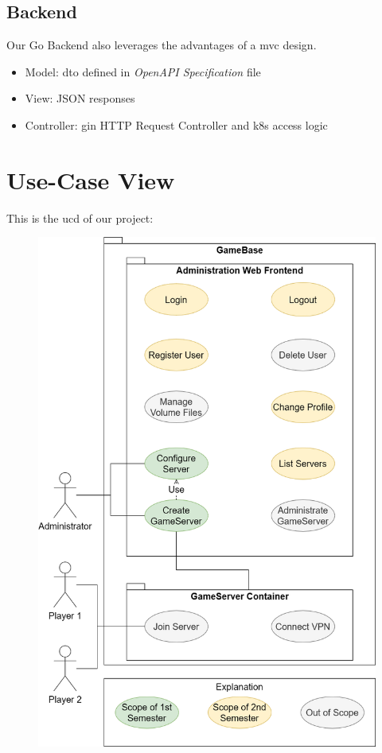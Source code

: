 \documentclass[a4paper,12pt,chapterprefix=false,bibliography=totoc,listof=totoc,]{scrreprt}
\begin{document}
\section{Backend}
Our Go Backend also leverages the advantages of a \gls{mvc} design.
\begin{itemize}
	\item Model: \gls{dto} defined in \textit{OpenAPI Specification} file
	\item View: JSON responses
	\item Controller: gin HTTP Request Controller and \gls{k8s} access logic
\end{itemize}
\chapter{Use-Case View}
This is the \gls{ucd} of our project:
\begin{figure}
	\includegraphics[width=\textwidth]{diagramms/Use_Case_Diagramm.png}
	\label{fig:ucd}
\end{figure}
\end{document}
